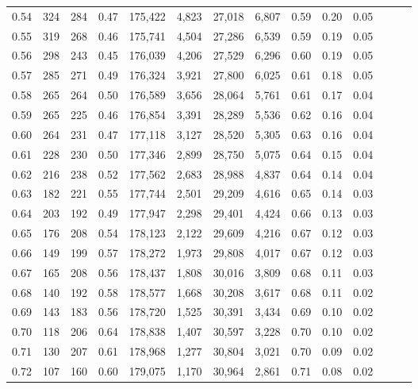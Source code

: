 \begin{tabular}{rrrrrrrrrrrrrr}
0.54 &     324 &  284 &  0.47 &  175,422 &    4,823 &  27,018 &   6,807 &  0.59 &  0.20 &      0.05 \\
0.55 &     319 &  268 &  0.46 &  175,741 &    4,504 &  27,286 &   6,539 &  0.59 &  0.19 &      0.05 \\
0.56 &     298 &  243 &  0.45 &  176,039 &    4,206 &  27,529 &   6,296 &  0.60 &  0.19 &      0.05 \\
0.57 &     285 &  271 &  0.49 &  176,324 &    3,921 &  27,800 &   6,025 &  0.61 &  0.18 &      0.05 \\
0.58 &     265 &  264 &  0.50 &  176,589 &    3,656 &  28,064 &   5,761 &  0.61 &  0.17 &      0.04 \\
0.59 &     265 &  225 &  0.46 &  176,854 &    3,391 &  28,289 &   5,536 &  0.62 &  0.16 &      0.04 \\
0.60 &     264 &  231 &  0.47 &  177,118 &    3,127 &  28,520 &   5,305 &  0.63 &  0.16 &      0.04 \\
0.61 &     228 &  230 &  0.50 &  177,346 &    2,899 &  28,750 &   5,075 &  0.64 &  0.15 &      0.04 \\
0.62 &     216 &  238 &  0.52 &  177,562 &    2,683 &  28,988 &   4,837 &  0.64 &  0.14 &      0.04 \\
0.63 &     182 &  221 &  0.55 &  177,744 &    2,501 &  29,209 &   4,616 &  0.65 &  0.14 &      0.03 \\
0.64 &     203 &  192 &  0.49 &  177,947 &    2,298 &  29,401 &   4,424 &  0.66 &  0.13 &      0.03 \\
0.65 &     176 &  208 &  0.54 &  178,123 &    2,122 &  29,609 &   4,216 &  0.67 &  0.12 &      0.03 \\
0.66 &     149 &  199 &  0.57 &  178,272 &    1,973 &  29,808 &   4,017 &  0.67 &  0.12 &      0.03 \\
0.67 &     165 &  208 &  0.56 &  178,437 &    1,808 &  30,016 &   3,809 &  0.68 &  0.11 &      0.03 \\
0.68 &     140 &  192 &  0.58 &  178,577 &    1,668 &  30,208 &   3,617 &  0.68 &  0.11 &      0.02 \\
0.69 &     143 &  183 &  0.56 &  178,720 &    1,525 &  30,391 &   3,434 &  0.69 &  0.10 &      0.02 \\
0.70 &     118 &  206 &  0.64 &  178,838 &    1,407 &  30,597 &   3,228 &  0.70 &  0.10 &      0.02 \\
0.71 &     130 &  207 &  0.61 &  178,968 &    1,277 &  30,804 &   3,021 &  0.70 &  0.09 &      0.02 \\
0.72 &     107 &  160 &  0.60 &  179,075 &    1,170 &  30,964 &   2,861 &  0.71 &  0.08 &      0.02 \\

\end{tabular}
